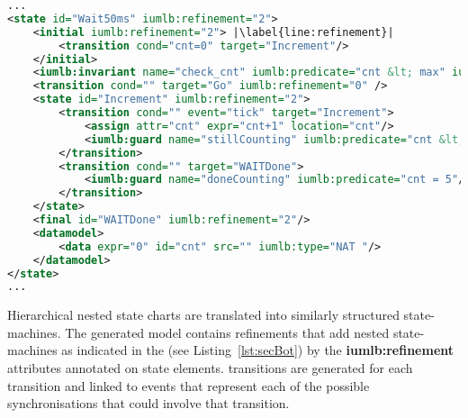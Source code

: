 \begin{lstlisting}[caption={\textbf{Wait50ms} state snippet of \SCXML model representation illustrating the use of different \SCXML modeling features, as well as, added syntax extensions},label={lst:secBot}, language=xml, escapechar=|, frame=single]
...
<state id="Wait50ms" iumlb:refinement="2">
	<initial iumlb:refinement="2"> |\label{line:refinement}|
		<transition cond="cnt=0" target="Increment"/> 
	</initial>
	<iumlb:invariant name="check_cnt" iumlb:predicate="cnt &lt; max" iumlb:refinement="2"/> |\label{line:invariant}|
	<transition cond="" target="Go" iumlb:refinement="0" />
	<state id="Increment" iumlb:refinement="2">
		<transition cond="" event="tick" target="Increment">
			<assign attr="cnt" expr="cnt+1" location="cnt"/>
			<iumlb:guard name="stillCounting" iumlb:predicate="cnt &lt; 5"/> |\label{line:predicate}|
		</transition>
		<transition cond="" target="WAITDone">
			<iumlb:guard name="doneCounting" iumlb:predicate="cnt = 5"/> |\label{line:guard}|
    	</transition>
	</state>
	<final id="WAITDone" iumlb:refinement="2"/>
	<datamodel>
		<data expr="0" id="cnt" src="" iumlb:type="NAT "/>
	</datamodel>
</state>
...
\end{lstlisting}

Hierarchical nested state charts are translated into similarly structured \iUMLB state-machines. The generated \iUMLB model contains refinements that add nested state-machines as indicated in the  \SCXML \statechart (see Listing~\ref{lst:secBot}) by the \textbf{iumlb:refinement} attributes annotated on state elements. \iUMLB transitions are generated for each \SCXML transition and linked to \EventB events that represent each of the possible synchronisations that could involve that transition.


